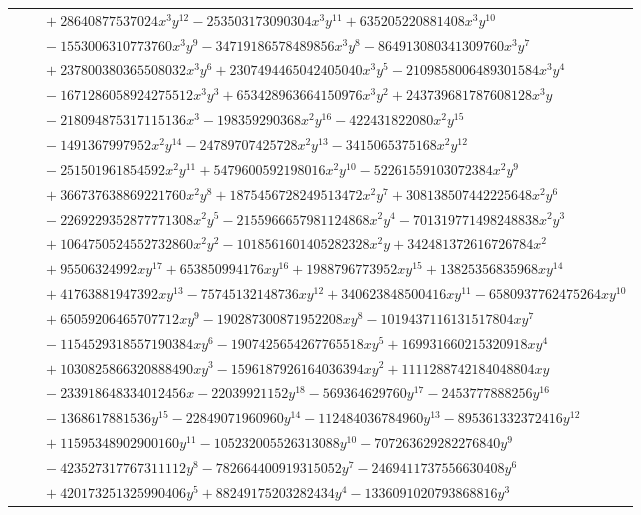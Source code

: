 \documentclass[11pt]{article}
\begin{document}
\begin{longtable}{@{}ll@{}}
 & $\quad +28640877537024x^{3}y^{12}-253503173090304x^{3}y^{11}+635205220881408x^{3}y^{10}$\\
 & $\quad -1553006310773760x^{3}y^{9}-34719186578489856x^{3}y^{8}-864913080341309760x^{3}y^{7}$\\
 & $\quad +237800380365508032x^{3}y^{6}+2307494465042405040x^{3}y^{5}-2109858006489301584x^{3}y^{4}$\\
 & $\quad -1671286058924275512x^{3}y^{3}+653428963664150976x^{3}y^{2}+243739681787608128x^{3}y$\\
 & $\quad -218094875317115136x^{3}-198359290368x^{2}y^{16}-422431822080x^{2}y^{15}$\\
 & $\quad -1491367997952x^{2}y^{14}-24789707425728x^{2}y^{13}-3415065375168x^{2}y^{12}$\\
 & $\quad -251501961854592x^{2}y^{11}+5479600592198016x^{2}y^{10}-52261559103072384x^{2}y^{9}$\\
 & $\quad +366737638869221760x^{2}y^{8}+1875456728249513472x^{2}y^{7}+308138507442225648x^{2}y^{6}$\\
 & $\quad -2269229352877771308x^{2}y^{5}-2155966657981124868x^{2}y^{4}-701319771498248838x^{2}y^{3}$\\
 & $\quad +1064750524552732860x^{2}y^{2}-1018561601405282328x^{2}y+342481372616726784x^{2}$\\
 & $\quad +95506324992xy^{17}+653850994176xy^{16}+1988796773952xy^{15}+13825356835968xy^{14}$\\
 & $\quad +41763881947392xy^{13}-75745132148736xy^{12}+340623848500416xy^{11}-6580937762475264xy^{10}$\\
 & $\quad +65059206465707712xy^{9}-190287300871952208xy^{8}-1019437116131517804xy^{7}$\\
 & $\quad -1154529318557190384xy^{6}-1907425654267765518xy^{5}+169931660215320918xy^{4}$\\
 & $\quad +1030825866320888490xy^{3}-1596187926164036394xy^{2}+1111288742184048804xy$\\
 & $\quad -233918648334012456x-22039921152y^{18}-569364629760y^{17}-2453777888256y^{16}$\\
 & $\quad -1368617881536y^{15}-22849071960960y^{14}-112484036784960y^{13}-895361332372416y^{12}$\\
 & $\quad +11595348902900160y^{11}-105232005526313088y^{10}-707263629282276840y^{9}$\\
 & $\quad -423527317767311112y^{8}-782664400919315052y^{7}-2469411737556630408y^{6}$\\
 & $\quad +420173251325990406y^{5}+88249175203282434y^{4}-1336091020793868816y^{3}$\\

\end{longtable}
\end{document}

